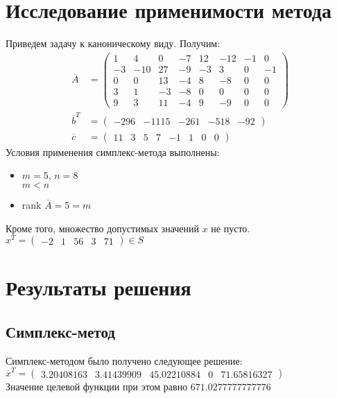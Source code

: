 \section{Исследование применимости метода}
Приведем задачу к каноническому виду. Получим:
\begin{align*} 
	\overline{A}&=
		\begin{pmatrix} 
			1 & 4 & 0 & -7 & 12 & -12 & -1 & 0 \\ 
			 -3 & -10 & 27 & -9 & -3 & 3 & 0 & -1 \\ 
			 0 & 0 & 13 & -4 & 8 & -8 & 0 & 0 \\ 
			 3 & 1 & -3 & -8 & 0 & 0 & 0 & 0 \\ 
			 9 & 3 & 11 & -4 & 9 & -9 & 0 & 0
		\end{pmatrix}\\
	\overline{b}^T&=
		\begin{pmatrix} 
			-296 &
			 -1115 & 
			 -261 & 
			 -518 & 
			 -92
		\end{pmatrix} \\
	\overline{c}&=
		\begin{pmatrix} 
			 11 & 
			 3 & 
			 5 & 
			 7 & 
			 -1 &
			 1 &
			 0 &
			 0
		\end{pmatrix}
\end{align*} 
Условия применения симплекс-метода выполнены:
\begin{itemize}
	\item $m = 5$, $n=8$ \\
	$m < n$
	
	\item rank $\overline{A}=5=m$
\end{itemize}
Кроме того, множество допустимых значений $x$ не пусто. $x^T=
	\begin{pmatrix} 
		 -2 &
		 1 &
		 56 & 
		 3 &
		 71
	\end{pmatrix} \in S$

\section{Результаты решения}
\subsection{Симплекс-метод}
Симплекс-методом было получено следующее решение:\\
$\overline{x}^T=
	\begin{pmatrix} 
		 3.20408163 &
		 3.41439909 &
		 45.02210884 & 
		 0 &
		 71.65816327
	\end{pmatrix}$\\
Значение целевой функции при этом равно $671.0277777777776$

